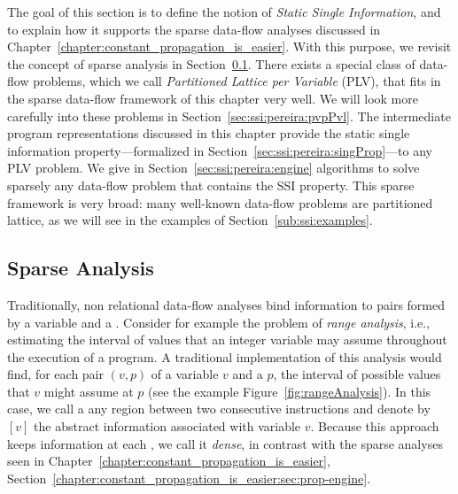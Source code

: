 {The goal of this section is to define the notion of \emph{Static Single 
Information}, and to explain how it supports 
the sparse data-flow analyses discussed in 
Chapter~\ref{chapter:constant_propagation_is_easier}.
With this purpose, we revisit the concept of sparse analysis in Section~\ref{sec:ssi:pereira:sparse}.
There exists a special class of data-flow problems, which we call 
\emph{Partitioned Lattice per Variable} (PLV), that fits in the sparse 
data-flow framework of this chapter very well.
We will look more carefully into these problems in Section~\ref{sec:ssi:pereira:pvpPvl}.
The intermediate program representations discussed in this chapter provide the 
static single information property---formalized in 
Section~\ref{sec:ssi:pereira:singProp}---to any PLV problem.
We give in Section~\ref{sec:ssi:pereira:engine} algorithms to solve sparsely 
any data-flow problem that contains the SSI property.
This sparse framework is very broad: many well-known data-flow problems are 
partitioned lattice, as we will see in the examples of 
Section~\ref{sub:ssi:examples}.


\subsection{Sparse Analysis}
\label{sec:ssi:pereira:sparse}

Traditionally, non relational data-flow analyses bind information to pairs formed by a variable and a \progpoint.
Consider for example the problem of \emph{range analysis}, i.e., estimating the interval of values that an 
integer variable may assume throughout the execution of a program.
A traditional implementation of this analysis would find, for each pair $(v,p)$ 
of a variable $v$ and a \progpoint $p$, the interval of possible values that 
$v$ might assume at $p$ (see the example Figure~\ref{fig:rangeAnalysis}).
In this case, we call a \progpoint any region between two consecutive 
instructions and denote by $[v]$ the abstract information associated with 
variable $v$.
Because this approach keeps information at each \progpoint, we call it {\em 
dense}, in contrast with the sparse analyses seen in 
Chapter~\ref{chapter:constant_propagation_is_easier},
Section~\ref{chapter:constant_propagation_is_easier:sec:prop-engine}.

\begin{figure}[t!]


\end{figure}}
